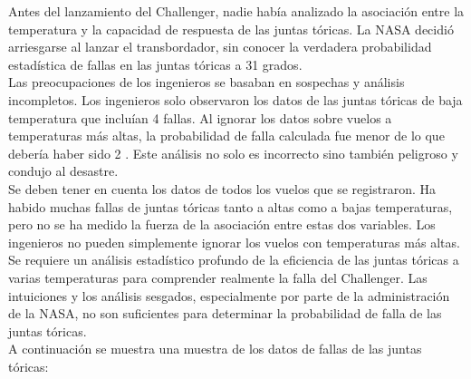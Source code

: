 Antes del lanzamiento del Challenger, nadie hab\'ia analizado la asociaci\'on
entre la temperatura y la capacidad de respuesta de las juntas t\'oricas. La
NASA decidi\'o arriesgarse al lanzar el transbordador, sin conocer la verdadera
probabilidad estad\'istica de fallas en las juntas t\'oricas a 31 grados. \\ 

Las preocupaciones de los ingenieros se basaban en sospechas y an\'alisis
incompletos. Los ingenieros solo observaron los datos de las juntas t\'oricas de
baja temperatura que inclu\'ian 4 fallas. Al ignorar los datos sobre vuelos a
temperaturas m\'as altas, la probabilidad de falla calculada fue menor de lo que
deber\'ia haber sido 2 . Este an\'alisis no solo es incorrecto sino tambi\'en
peligroso y condujo al desastre. \\

Se deben tener en cuenta los datos de todos los vuelos que se registraron. Ha
habido muchas fallas de juntas t\'oricas tanto a altas como a bajas
temperaturas, pero no se ha medido la fuerza de la asociaci\'on entre estas dos
variables. Los ingenieros no pueden simplemente ignorar los vuelos con
temperaturas m\'as altas.\\

Se requiere un an\'alisis estad\'istico profundo de la eficiencia de las juntas
t\'oricas a varias temperaturas para comprender realmente la falla del
Challenger. Las intuiciones y los an\'alisis sesgados, especialmente por parte
de la administraci\'on de la NASA, no son suficientes para determinar la
probabilidad de falla de las juntas t\'oricas.\\

A continuaci\'on se muestra una muestra de los datos de fallas de las juntas
t\'oricas:\\



